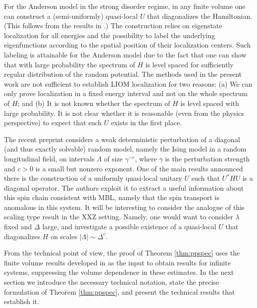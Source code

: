 \documentclass[12pt, a4paper,reqno]{amsart}
\numberwithin{equation}{section}
\newcommand\La{\Lambda}
\begin{document}
 For the Anderson model in the strong disorder regime, in any finite volume  one can construct a (semi-uniformly) quasi-local $U$ that diagonalizes the Hamiltonian.  (This follows from the results in  \cite{EK}.) The construction relies on eigenstate localization for all energies and the possibility to label the underlying eigenfunctions according to the spatial position of their localization centers.  Such labeling is attainable for the Anderson model due to the fact that one can show that with large probability the spectrum of $H$ is level spaced for  sufficiently regular distribution of the random potential. The methods used in the present work are not sufficient to establish LIOM localization for two reasons: (a) We can only prove localization in a fixed energy interval and not on the whole spectrum of $H$; and  (b) It is not known whether the spectrum of $H$ is level spaced with large probability. It is  not clear whether it is reasonable (even from the physics perspective) to expect that such $U$ exists in the first place.






 The recent  preprint \cite{DGHP}   considers a weak deterministic perturbation of  a diagonal (and thus exactly solvable) random model, namely the  Ising model in a random longitudinal field, on intervals $\La$ of size $\gamma^{-c}$, where $\gamma$ is the perturbation strength and $c>0$ is a small but nonzero exponent. One of the main results announced there is the construction of a uniformly quasi-local unitary $U$ such that $U^*HU$ is a diagonal operator.   The authors exploit it to extract a useful information about  this spin chain consistent with MBL, namely that the spin transport is anomalous in this system. It will be interesting to consider 
the analogue of this scaling type result in the XXZ setting. Namely, one would want to consider $\lambda$ fixed and $\Delta$ large, and investigate a possible existence of a quasi-local $U$ that diagonalizes $H$ on scales $|\La|\sim \Delta^c$. 





 
 From the technical point of view, the proof of Theorem \ref{thm:ppspec} uses the finite volume results developed in \cite{EK22} as the input to obtain results for infinite systems, suppressing the volume dependence in these estimates.  In the next section we introduce the necessary technical notation, state the precise formulation of Theorem \ref{thm:ppspec}, and present  
 the technical results that  establish it.
 
\end{document}

